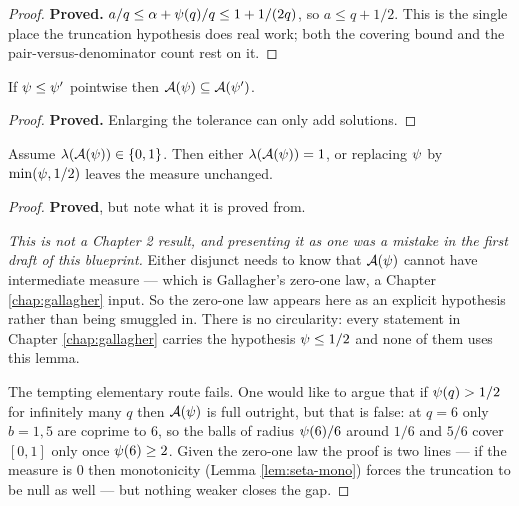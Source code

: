 \begin{proof}
  \leanok
  \textbf{Proved.} $a/q \leq \alpha + \psi(q)/q \leq 1 + 1/(2q)$, so $a \leq q + 1/2$.
  This is the single place the truncation hypothesis does real work; both the covering
  bound and the pair-versus-denominator count rest on it.
\end{proof}

\begin{lemma}[Monotonicity in $\ps$]
  \label{lem:seta-mono}
  \leanok
  If $\psi \leq \psi'$ pointwise then $\mathcal{A}(\psi) \subseteq \mathcal{A}(\psi')$.
\end{lemma}

\begin{proof}
  \leanok
  \textbf{Proved.} Enlarging the tolerance can only add solutions.
\end{proof}

\begin{lemma}
  \label{lem:truncate}
  \leanok
  Assume $\lambda(\mathcal{A}(\psi)) \in \{0,1\}$. Then either $\lambda(\mathcal{A}(\psi)) = 1$, or replacing
  $\ps$ by $\min(\psi, 1/2)$ leaves the measure unchanged.
\end{lemma}

\begin{proof}
  \leanok
  \textbf{Proved}, but note what it is proved from.

  \emph{This is not a Chapter 2 result, and presenting it as one was a mistake in the
  first draft of this blueprint.} Either disjunct needs to know that $\mathcal{A}(\psi)$ cannot
  have intermediate measure --- which is Gallagher's zero-one law, a Chapter
  \ref{chap:gallagher} input. So the zero-one law appears here as an explicit
  hypothesis rather than being smuggled in. There is no circularity: every statement in
  Chapter \ref{chap:gallagher} carries the hypothesis $\psi \leq 1/2$ and none of them
  uses this lemma.

  The tempting elementary route fails. One would like to argue that if $\psi(q) > 1/2$
  for infinitely many $q$ then $\mathcal{A}(\psi)$ is full outright, but that is false: at $q = 6$
  only $b = 1, 5$ are coprime to $6$, so the balls of radius $\psi(6)/6$ around $1/6$ and
  $5/6$ cover $[0,1]$ only once $\psi(6) \geq 2$. Given the zero-one law the proof is two
  lines --- if the measure is $0$ then monotonicity (Lemma \ref{lem:seta-mono}) forces
  the truncation to be null as well --- but nothing weaker closes the gap.
\end{proof}


